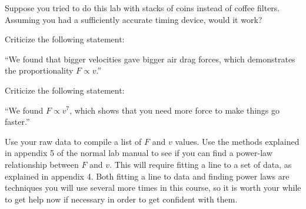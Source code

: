 \prelab

\prelabquestion Suppose you tried to do this lab with stacks of coins
instead of coffee filters. Assuming you had a sufficiently
accurate timing device, would it work?

\prelabquestion Criticize the following statement:

``We found that bigger velocities gave bigger air drag
forces, which demonstrates the proportionality $F\propto v$.''

\prelabquestion Criticize the following statement:

``We found $F\propto v^7$, which shows that you need more
force to make things go faster.''

\analysis

Use your raw data to compile a list of $F$ and $v$ values.
Use the methods explained in appendix 5 of the normal lab manual to see if you can
find a power-law relationship between $F$ and $v$. This will
require fitting a line to a set of data, as explained in
appendix 4. Both fitting a line to data and finding power
laws are techniques you will use several more times in this
course, so it is worth your while to get help now if
necessary in order to get confident with them.


